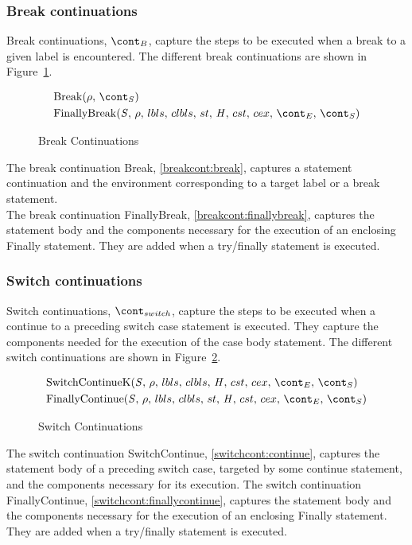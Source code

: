 \documentclass{article}
\begin{document}
\subsubsection{Break continuations}
\label{subsubsec:break-continuations}

Break continuations, $\bcont$, capture the steps to be executed when a break to a given label is encountered.
The different break continuations are shown in Figure~\ref{figure:breakcont}.
\newcommand{\Break}[2]{\mathrm{Break}(#1,\,#2)}
\newcommand{\FinallyBreak}[2]{\mathrm{FinallyBreak}({#1},\,\env,\,\lbls,\,\clbls,\,\strace,\,\handler,\,\cstrace,\,\cex,\,\econt,\,{#2})}

\begin{figure}[Htp]
  \begin{align}
    &\Break{\env}{\scont} \label{breakcont:break} \\
    &\FinallyBreak{\stmt}{\scont} \label{breakcont:finallybreak}
  \end{align}
  \caption{Break Continuations}
  \label{figure:breakcont}
\end{figure}
\noindent
The break continuation Break, \ref{breakcont:break}, captures a statement continuation and the environment corresponding to a target label or a break statement.\\
The break continuation FinallyBreak, \ref{breakcont:finallybreak}, captures the statement body and the components necessary for the execution of an enclosing Finally statement.
They are added when a try/finally statement is executed.
\subsubsection{Switch continuations}
\label{subsubsec:switch-continuations}

Switch continuations, $\switchcont$, capture the steps to be executed when a continue to a preceding switch case statement is executed.
They capture the components needed for the execution of the case body statement.
The different switch continuations are shown in Figure~\ref{figure:switchconts}.
%
\newcommand{\ContinueK}{\mathrm{SwitchContinueK}(\stmt,\,\env,\,\lbls,\,\clbls,\,\handler,\,\cstrace,\,\cex,\,\econt,\,\scont)}
\newcommand{\FinallyContinue}[2]{\mathrm{FinallyContinue}({#1},\,\env,\,\lbls,\,\clbls,\,\strace,\,\handler,\,\cstrace,\,\cex,\,\econt,\,{#2})}

\begin{figure}[Htp]
  \begin{align}
    &\ContinueK \label{switchcont:continue} \\
    &\FinallyContinue{\stmt}{\scont} \label{switchcont:finallycontinue}
  \end{align}
  \caption{Switch Continuations}
  \label{figure:switchconts}
\end{figure}
\noindent
The switch continuation SwitchContinue, \ref{switchcont:continue}, captures the statement body of a preceding switch case, targeted by some continue statement, and the components necessary for its execution.
The switch continuation FinallyContinue, \ref{switchcont:finallycontinue}, captures the statement body and the components necessary for the execution of an enclosing Finally statement.
They are added when a try/finally statement is executed.
\end{document}
